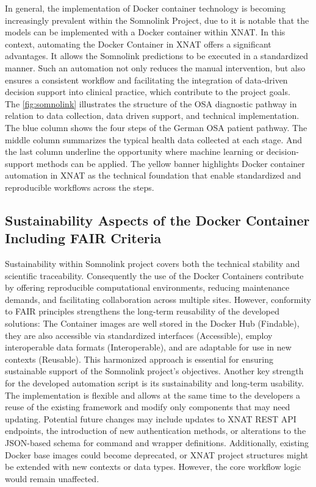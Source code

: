In general, the implementation of Docker container technology is becoming increasingly prevalent within the Somnolink Project, due to it is notable that the models can be implemented with a Docker container within XNAT.
In this context, automating the Docker Container in XNAT offers a significant advantages. It allows the Somnolink predictions to be executed in a standardized manner. Such an automation not only reduces the manual intervention, but also ensures a consistent  workflow and facilitating the integration of data-driven decision support into clinical practice, which contribute to the project goals.\\
The \autoref{fig:somnolink} illustrates the structure of the OSA diagnostic pathway in relation to data collection, data driven support, and technical implementation.
The blue column shows the four steps of the German OSA patient pathway. The middle column summarizes the typical health data collected at each stage. And the last column underline the opportunity where machine learning or decision-support methods can be applied. 
The yellow banner highlights Docker container automation in XNAT  as the technical foundation that enable standardized and reproducible workflows across the steps.

\subsection{Sustainability Aspects of the Docker Container Including FAIR Criteria}
Sustainability within Somnolink project covers both the technical stability and scientific traceability. Consequently the use of the Docker Containers contribute by offering reproducible computational environments, reducing maintenance demands, and facilitating collaboration across multiple sites. However, conformity to FAIR principles strengthens the long-term reusability of the developed solutions: The Container images are well stored in the Docker Hub (Findable), they are also accessible via standardized interfaces (Accessible), employ interoperable data formats (Interoperable), and are adaptable for use in new contexts (Reusable). This harmonized approach is essential for ensuring sustainable support of the Somnolink project’s objectives. 
Another key strength for the developed automation script is its sustainability and long-term usability. The implementation is flexible and allows at the same time to the developers a reuse of the existing framework and modify only components that may need updating. Potential future changes may include updates to XNAT REST API endpoints, the introduction of new authentication methods, or alterations to the JSON-based schema for command and wrapper definitions. Additionally, existing Docker base images could become deprecated, or XNAT project structures might be extended with new contexts or data types. However, the core workflow logic would remain unaffected.

